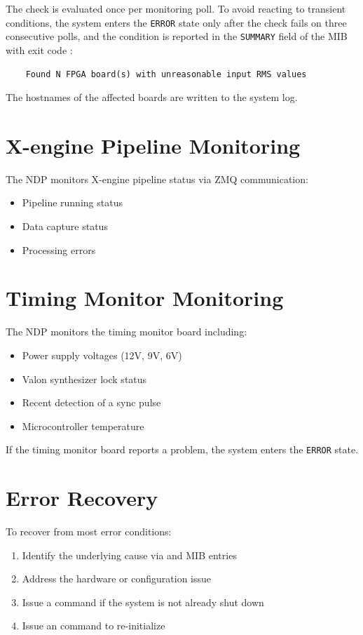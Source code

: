 The check is evaluated once per monitoring poll.  To avoid reacting to transient conditions, the system enters the \texttt{ERROR} state only after the check fails on three consecutive polls, and the condition is reported in the \texttt{SUMMARY} field of the MIB with exit code :

\begin{verbatim}
    Found N FPGA board(s) with unreasonable input RMS values
\end{verbatim}

\noindent The hostnames of the affected boards are written to the system log.

\section{X-engine Pipeline Monitoring}

The NDP monitors X-engine pipeline status via ZMQ communication:
\begin{itemize}
    \item Pipeline running status
    \item Data capture status
    \item Processing errors
\end{itemize}

\section{Timing Monitor Monitoring}

The NDP monitors the timing monitor board including:
\begin{itemize}
    \item Power supply voltages (12V, 9V, 6V)
    \item Valon synthesizer lock status
    \item Recent detection of a sync pulse
    \item Microcontroller temperature
\end{itemize}

If the timing monitor board reports a problem, the system enters the \texttt{ERROR} state.

\section{Error Recovery}

To recover from most error conditions:
\begin{enumerate}
    \item Identify the underlying cause via  and  MIB entries
    \item Address the hardware or configuration issue
    \item Issue a  command if the system is not already shut down
    \item Issue an  command to re-initialize
\end{enumerate}


